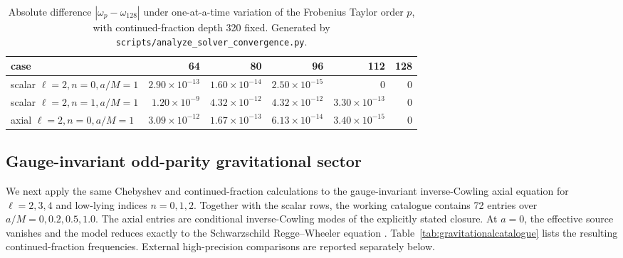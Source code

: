 \documentclass[12pt,a4paper]{article}
\begin{document}
\begin{table}[H]
\centering
\footnotesize
\begin{tabular}{lrrrrr}
\toprule
case & 64 & 80 & 96 & 112 & 128\\
\midrule
scalar \(\ell=2,n=0,a/M=1\) & \(2.90\times10^{-13}\) & \(1.60\times10^{-14}\) & \(2.50\times10^{-15}\) & 0 & 0\\
scalar \(\ell=2,n=1,a/M=1\) & \(1.20\times10^{-9}\) & \(4.32\times10^{-12}\) & \(4.32\times10^{-12}\) & \(3.30\times10^{-13}\) & 0\\
axial \(\ell=2,n=0,a/M=1\) & \(3.09\times10^{-12}\) & \(1.67\times10^{-13}\) & \(6.13\times10^{-14}\) & \(3.40\times10^{-15}\) & 0\\
\bottomrule
\end{tabular}
\caption{Absolute difference \(|\omega_p-\omega_{128}|\) under one-at-a-time
variation of the Frobenius Taylor order \(p\), with continued-fraction depth
320 fixed.  Generated by
\texttt{scripts/analyze\_solver\_convergence.py}.}
\label{tab:taylorconvergence}
\end{table}

\subsection{Gauge-invariant odd-parity gravitational sector}

We next apply the same Chebyshev and continued-fraction calculations to the
gauge-invariant inverse-Cowling axial equation for \(\ell=2,3,4\) and low-lying
indices \(n=0,1,2\).  Together with the scalar rows, the working catalogue
contains 72 entries over \(a/M=0,0.2,0.5,1.0\).  The axial entries are
conditional inverse-Cowling modes of the explicitly stated closure. At
\(a=0\), the effective source vanishes and the
model reduces exactly to the Schwarzschild Regge--Wheeler equation
\cite{Regge1957,Gerlach1979,Karlovini2002}.
Table~\ref{tab:gravitationalcatalogue} lists the resulting continued-fraction
frequencies.  External high-precision comparisons are reported separately
below.
\color{black}
\end{document}
